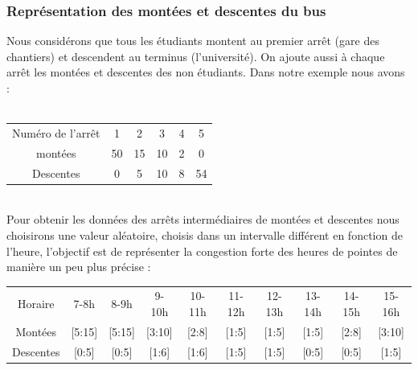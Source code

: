 \documentclass[a4paper,11pt]{article}
\begin{document}
		\subsubsection{Représentation des montées et descentes du bus}
			Nous considérons que tous les étudiants montent au premier arrêt (gare des chantiers) et descendent au terminus (l'université). On ajoute aussi à chaque arrêt les montées et descentes des non étudiants. Dans notre exemple nous avons : \\
			\\
			\begin{tabular}{ | c | c | c | c | c | c |}
 				\hline			
   				Numéro de l'arrêt	& 1 	& 2 	& 3 	& 4 	& 5\\
   				montées				& 50 	& 15 	& 10 	& 2 	& 0\\
   				Descentes			& 0 	& 5 	& 10 	& 8 	& 54\\
 				\hline  
 			\end{tabular}\\
 			Pour obtenir les données des arrêts intermédiaires de montées et descentes nous choisirons une valeur aléatoire, choisis dans un intervalle différent en fonction de l'heure, l'objectif est de représenter la congestion forte des heures de pointes de manière un peu plus précise : \\
 			\begin{tabular}{ | c | c | c | c | c | c | c | c | c | c |}
 				\hline			
   				Horaire & 7-8h & 8-9h & 9-10h & 10-11h & 11-12h & 12-13h & 13-14h & 14-15h & 15-16h\\
   				Montées & [5:15] & [5:15] & [3:10] & [2:8] & [1:5] & [1:5] & [1:5] & [2:8] & [3:10]\\
   				Descentes & [0:5] & [0:5] & [1:6] & [1:6] & [1:5] & [1:5] & [0:5] & [0:5] & [1:5]\\
 				\hline  
 			\end{tabular}\\
\end{document}
